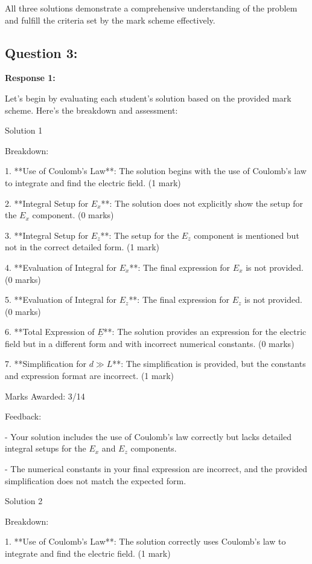 \documentclass[a4paper,11pt]{article}
\begin{document}
All three solutions demonstrate a comprehensive understanding of the problem and fulfill the criteria set by the mark scheme effectively.

\subsection*{Question 3:}

\textbf{Response 1:}

Let's begin by evaluating each student's solution based on the provided mark scheme. Here's the breakdown and assessment:

Solution 1

Breakdown:

1. **Use of Coulomb's Law**: The solution begins with the use of Coulomb's law to integrate and find the electric field. (1 mark)

2. **Integral Setup for \(E_x\)**: The solution does not explicitly show the setup for the \(E_x\) component. (0 marks)

3. **Integral Setup for \(E_z\)**: The setup for the \(E_z\) component is mentioned but not in the correct detailed form. (1 mark)

4. **Evaluation of Integral for \(E_x\)**: The final expression for \(E_x\) is not provided. (0 marks)

5. **Evaluation of Integral for \(E_z\)**: The final expression for \(E_z\) is not provided. (0 marks)

6. **Total Expression of \( \underline{E} \)**: The solution provides an expression for the electric field but in a different form and with incorrect numerical constants. (0 marks)

7. **Simplification for \( d \gg L \)**: The simplification is provided, but the constants and expression format are incorrect. (1 mark)

Marks Awarded: 3/14

Feedback:

- Your solution includes the use of Coulomb's law correctly but lacks detailed integral setups for the \(E_x\) and \(E_z\) components. 

- The numerical constants in your final expression are incorrect, and the provided simplification does not match the expected form.

Solution 2

Breakdown:

1. **Use of Coulomb's Law**: The solution correctly uses Coulomb's law to integrate and find the electric field. (1 mark)
\end{document}
